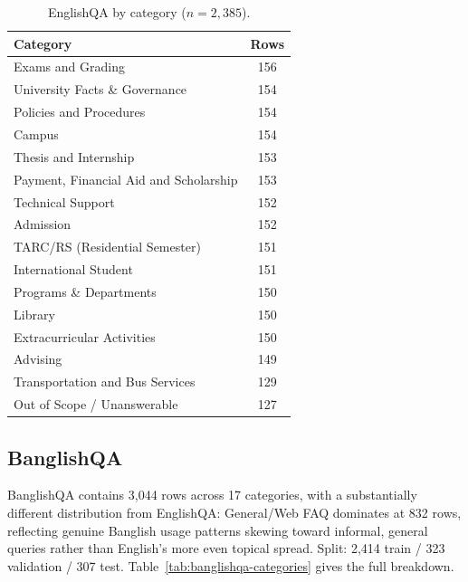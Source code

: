 \documentclass[a4paper,twoside]{article}
\begin{document}
\begin{table}[h]
\caption{EnglishQA by category ($n=2{,}385$).}\label{tab:englishqa-categories}\centering
\begin{tabular}{|l|c|}
\hline
Category & Rows \\
\hline
Exams and Grading & 156 \\
University Facts \& Governance & 154 \\
Policies and Procedures & 154 \\
Campus & 154 \\
Thesis and Internship & 153 \\
Payment, Financial Aid and Scholarship & 153 \\
Technical Support & 152 \\
Admission & 152 \\
TARC/RS (Residential Semester) & 151 \\
International Student & 151 \\
Programs \& Departments & 150 \\
Library & 150 \\
Extracurricular Activities & 150 \\
Advising & 149 \\
Transportation and Bus Services & 129 \\
Out of Scope / Unanswerable & 127 \\
\hline
\end{tabular}
\end{table}

\subsection{BanglishQA}
\label{subsec:banglishqa}

BanglishQA contains 3{,}044 rows across 17 categories, with a substantially different distribution from EnglishQA: General/Web FAQ dominates at 832 rows, reflecting genuine Banglish usage patterns skewing toward informal, general queries rather than English's more even topical spread. Split: 2{,}414 train / 323 validation / 307 test. Table~\ref{tab:banglishqa-categories} gives the full breakdown.
\end{document}
